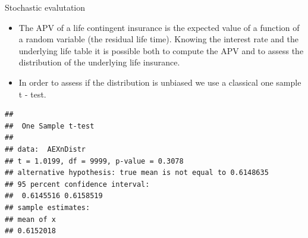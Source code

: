 \begin{frame}[fragile]{Stochastic evalutation}

\begin{itemize}[<+->]
\itemsep1pt\parskip0pt
\item
  The APV of a life contingent insurance is the expected value of a
  function of a random variable (the residual life time). Knowing the
  interest rate and the underlying life table it is possible both to
  compute the APV and to assess the distribution of the underlying life
  insurance.
\end{itemize}

\begin{Shaded}
\begin{Highlighting}[]
\NormalTok{(} \NormalTok{,}\NormalTok{) }
\NormalTok{(}\NormalTok{,}
 \NormalTok{,} \NormalTok{,}
\NormalTok{,} 
\end{Highlighting}
\end{Shaded}

\end{frame}

\begin{frame}[fragile]

\begin{itemize}[<+->]
\itemsep1pt\parskip0pt
\item
  In order to assess if the distribution is unbiased we use a classical
  one sample t - test.
\end{itemize}

\begin{Shaded}
\begin{Highlighting}[]
\NormalTok{(} 
\end{Highlighting}
\end{Shaded}

\begin{verbatim}
## 
##  One Sample t-test
## 
## data:  AEXnDistr
## t = 1.0199, df = 9999, p-value = 0.3078
## alternative hypothesis: true mean is not equal to 0.6148635
## 95 percent confidence interval:
##  0.6145516 0.6158519
## sample estimates:
## mean of x 
## 0.6152018
\end{verbatim}

\end{frame}

